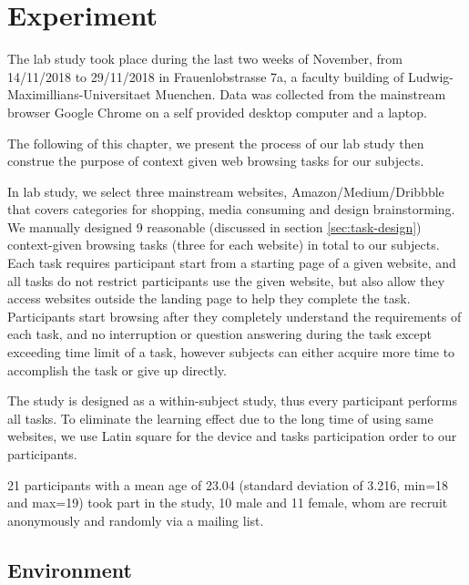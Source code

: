 \section{Experiment}
\label{ch:exp}

The lab study took place during the last two weeks of November, from 14/11/2018 to 29/11/2018
in Frauenlobstrasse 7a, a faculty building of Ludwig-Maximillians-Universitaet Muenchen.
Data was collected from the mainstream browser Google Chrome on a self provided 
desktop computer and a laptop.

The following of this chapter, we present the process of our lab study then construe the purpose 
of context given web browsing tasks for our subjects.


In lab study, we select three mainstream websites, Amazon/Medium/Dribbble 
that covers categories for shopping, media consuming and design brainstorming. 
We manually designed 9 reasonable (discussed in section \ref{sec:task-design})
context-given browsing tasks (three for each website) in total to our subjects.
Each task requires participant start from a starting page of a given website, and
all tasks do not restrict participants use the given website, but also allow they 
access websites outside the landing page to help they complete the task.
Participants start browsing after they completely understand the requirements of each task,
and no interruption or question answering during the task
except exceeding time limit of a task, however subjects can either acquire more time to accomplish
the task or give up directly.

The study is designed as a within-subject study, thus every participant performs all tasks.
To eliminate the learning effect due to the long time of using same websites, 
we use Latin square \cite{cochran1950experimental} 
for the device and tasks participation order to our participants.

21 participants with a mean age of 23.04 (standard deviation of 3.216, min=18 and max=19) 
took part in the study, 10 male and 11 female, whom are recruit anonymously and randomly via a mailing list.

\subsection{Environment}

